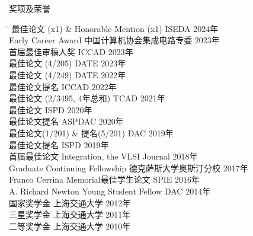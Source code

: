 
\begin{rSection}{奖项及荣誉}
\begin{tabbing}
\hspace{3.8in}\= \hspace{2.6in}\= \kill
最佳论文 (x1) \& Honorable Mention (x1) \> ISEDA \> { 2024年 } \\
Early Career Award \> 中国计算机协会集成电路专委 \> { 2023年 } \\
首届最佳审稿人奖 \> ICCAD \> { 2023年 } \\
最佳论文 (4/205) \> DATE \> { 2023年 } \\
最佳论文 (4/249) \> DATE \> { 2022年 } \\
最佳论文提名 \> ICCAD \> { 2022年 } \\
最佳论文 (2/3495, 4年总和) \> TCAD \> { 2021年 } \\
最佳论文 \> ISPD \> { 2020年 } \\
最佳论文提名 \> ASPDAC \> { 2020年 } \\
最佳论文(1/201) \& 提名(5/201) \> DAC \> { 2019年 } \\
最佳论文提名 \> ISPD \> { 2019年 } \\
首届最佳论文 \> Integration, the VLSI Journal \> { 2018年 } \\
Graduate Continuing Fellowship \> 德克萨斯大学奥斯汀分校 \> { 2017年 } \\
Franco Cerrina Memorial最佳学生论文 \> SPIE \> { 2016年 } \\
A. Richard Newton Young Student Fellow \> DAC \> { 2014年 } \\
国家奖学金 \> 上海交通大学 \> { 2012年 } \\
三星奖学金 \> 上海交通大学 \> { 2011年 } \\
二等奖学金 \> 上海交通大学 \> { 2010年 }
\end{tabbing}
\end{rSection}

